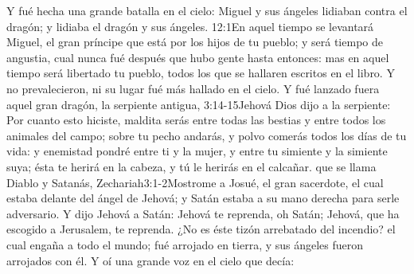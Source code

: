 Y fué hecha una grande batalla en el cielo: Miguel y sus ángeles lidiaban contra el dragón; y lidiaba el dragón y sus ángeles.%
					{12:1}{En aquel tiempo se levantará Miguel, el gran príncipe que está por los hijos de tu pueblo; y será tiempo de angustia, cual nunca fué después que hubo gente hasta entonces: mas en aquel tiempo será libertado tu pueblo, todos los que se hallaren escritos en el libro.}
Y no prevalecieron, ni su lugar fué más hallado en el cielo.%
Y fué lanzado fuera aquel gran dragón, la serpiente antigua,%
						{3:14-15}{Jehová Dios dijo a la serpiente: Por cuanto esto hiciste, maldita serás entre todas las bestias y entre todos los animales del campo; sobre tu pecho andarás, y polvo comerás todos los días de tu vida: y enemistad pondré entre ti y la mujer, y entre tu simiente y la simiente suya; ésta te herirá en la cabeza, y tú le herirás en el calcañar.}
 que se llama Diablo y Satanás,%
		{Zechariah}{3:1-2}{Mostrome a Josué, el gran sacerdote, el cual estaba delante del ángel de Jehová; y Satán estaba a su mano derecha para serle adversario. Y dijo Jehová a Satán: Jehová te reprenda, oh Satán; Jehová, que ha escogido a Jerusalem, te reprenda. ¿No es éste tizón arrebatado del incendio?}
 el cual engaña a todo el mundo; fué arrojado en tierra, y sus ángeles fueron arrojados con él. 
Y oí una grande voz en el cielo que decía:
